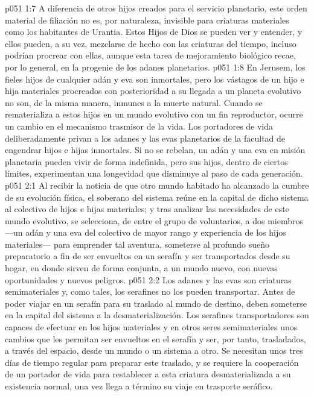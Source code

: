 \vs p051 1:7 A diferencia de otros hijos creados para el servicio planetario, este orden material de filiación no es, por naturaleza, invisible para criaturas materiales como los habitantes de Urantia. Estos Hijos de Dios se pueden ver y entender, y ellos pueden, a su vez, mezclarse de hecho con las criaturas del tiempo, incluso podrían procrear con ellas, aunque esta tarea de mejoramiento biológico recae, por lo general, en la progenie de los adanes planetarios.
\vs p051 1:8 \pc En Jerusem, los fieles hijos de cualquier adán y eva son inmortales, pero los vástagos de un hijo e hija materiales procreados con posterioridad a su llegada a un planeta evolutivo no son, de la misma manera, inmunes a la muerte natural. Cuando se rematerializa a estos hijos en un mundo evolutivo con un fin reproductor, ocurre un cambio en el mecanismo trasmisor de la vida. Los portadores de vida deliberadamente privan a los adanes y las evas planetarios de la facultad de engendrar hijos e hijas inmortales. Si no se rebelan, un adán y una eva en misión planetaria pueden vivir de forma indefinida, pero sus hijos, dentro de ciertos límites, experimentan una longevidad que disminuye al paso de cada generación.
\vs p051 2:1 Al recibir la noticia de que otro mundo habitado ha alcanzado la cumbre de su evolución física, el soberano del sistema reúne en la capital de dicho sistema al colectivo de hijos e hijas materiales; y tras analizar las necesidades de este mundo evolutivo, se selecciona, de entre el grupo de voluntarios, a dos miembros ---un adán y una eva del colectivo de mayor rango y experiencia de los hijos materiales--- para emprender tal aventura, someterse al profundo sueño preparatorio a fin de ser envueltos en un serafín y ser transportados desde su hogar, en donde sirven de forma conjunta, a un mundo nuevo, con nuevas oportunidades y nuevos peligros.
\vs p051 2:2 Los adanes y las evas son criaturas semimateriales y, como tales, los serafines no los pueden transportar. Antes de poder viajar en un serafín para su traslado al mundo de destino, deben someterse en la capital del sistema a la desmaterialización. Los serafines transportadores son capaces de efectuar en los hijos materiales y en otros seres semimateriales unos cambios que les permitan ser envueltos en el serafín y ser, por tanto, trasladados, a través del espacio, desde un mundo o un sistema a otro. Se necesitan unos tres días de tiempo regular para preparar este traslado, y se requiere la cooperación de un portador de vida para restablecer a esta criatura desmaterializada a su existencia normal, una vez llega a término su viaje en trasporte seráfico.
